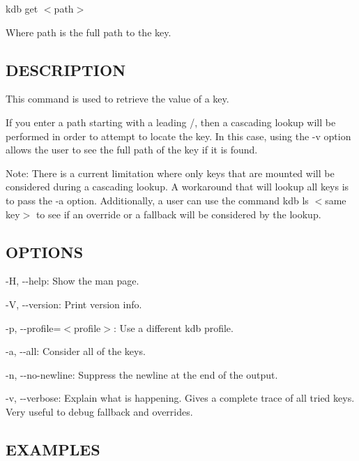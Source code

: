 {\ttfamily kdb get $<$path$>$}

Where {\ttfamily path} is the full path to the key.

\subsection*{D\+E\+S\+C\+R\+I\+P\+T\+I\+O\+N}

This command is used to retrieve the value of a key.

If you enter a {\ttfamily path} starting with a leading {\ttfamily /}, then a cascading lookup will be performed in order to attempt to locate the key. In this case, using the {\ttfamily -\/v} option allows the user to see the full {\ttfamily path} of the key if it is found.

Note\+: There is a current limitation where only keys that are mounted will be considered during a cascading lookup. A workaround that will lookup all keys is to pass the {\ttfamily -\/a} option. Additionally, a user can use the command {\ttfamily kdb ls $<$same key$>$} to see if an override or a fallback will be considered by the lookup.

\subsection*{O\+P\+T\+I\+O\+N\+S}


\begin{DoxyItemize}
\item {\ttfamily -\/\+H}, {\ttfamily -\/-\/help}\+: Show the man page.
\item {\ttfamily -\/\+V}, {\ttfamily -\/-\/version}\+: Print version info.
\item {\ttfamily -\/p}, {\ttfamily -\/-\/profile}=$<$profile$>$\+: Use a different kdb profile.
\item {\ttfamily -\/a}, {\ttfamily -\/-\/all}\+: Consider all of the keys.
\item {\ttfamily -\/n}, {\ttfamily -\/-\/no-\/newline}\+: Suppress the newline at the end of the output.
\item {\ttfamily -\/v}, {\ttfamily -\/-\/verbose}\+: Explain what is happening. Gives a complete trace of all tried keys. Very useful to debug fallback and overrides.
\end{DoxyItemize}

\subsection*{E\+X\+A\+M\+P\+L\+E\+S}

